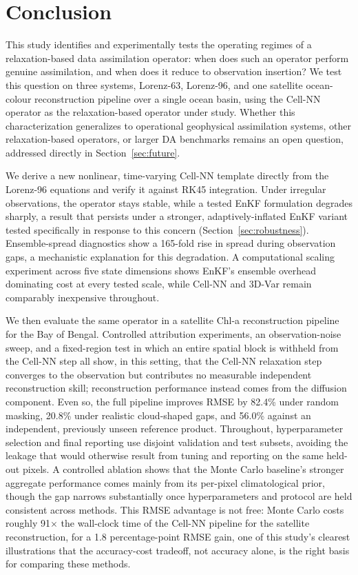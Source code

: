 \documentclass[final,5p,times,twocolumn,authoryear]{elsarticle}
\begin{document}
\FloatBarrier
\section{Conclusion}

This study identifies and experimentally tests the operating regimes
of a relaxation-based data assimilation operator: when does such an
operator perform genuine assimilation, and when does it reduce to
observation insertion? We test this question on three systems,
Lorenz-63, Lorenz-96, and one satellite ocean-colour reconstruction
pipeline over a single ocean basin, using the Cell-NN operator as the
relaxation-based operator under study. Whether this characterization
generalizes to operational geophysical assimilation systems, other
relaxation-based operators, or larger DA benchmarks remains an open
question, addressed directly in Section~\ref{sec:future}.

We derive a new nonlinear, time-varying Cell-NN template directly
from the Lorenz-96 equations and verify it against RK45 integration.
Under irregular observations, the operator stays stable, while a
tested EnKF formulation degrades sharply, a result that persists
under a stronger, adaptively-inflated EnKF variant tested
specifically in response to this concern
(Section~\ref{sec:robustness}). Ensemble-spread diagnostics show a
165-fold rise in spread during observation gaps, a mechanistic
explanation for this degradation. A computational scaling experiment
across five state dimensions shows EnKF's ensemble overhead
dominating cost at every tested scale, while Cell-NN and 3D-Var
remain comparably inexpensive throughout.

We then evaluate the same operator in a satellite Chl-a
reconstruction pipeline for the Bay of Bengal. Controlled attribution
experiments, an observation-noise sweep, and a fixed-region test in
which an entire spatial block is withheld from the Cell-NN step all
show, in this setting, that the Cell-NN relaxation step converges to
the observation but contributes no measurable independent
reconstruction skill; reconstruction performance instead comes from
the diffusion component. Even so, the full pipeline improves RMSE by
82.4\% under random masking, 20.8\% under realistic cloud-shaped
gaps, and 56.0\% against an independent, previously unseen reference
product. Throughout, hyperparameter selection and final reporting
use disjoint validation and test subsets, avoiding the leakage that
would otherwise result from tuning and reporting on the same
held-out pixels. A controlled ablation shows that the Monte Carlo
baseline's stronger aggregate performance comes mainly from its
per-pixel climatological prior, though the gap narrows substantially
once hyperparameters and protocol are held consistent across methods.
This RMSE advantage is not free: Monte Carlo costs roughly
91$\times$ the wall-clock time of the Cell-NN pipeline for the
satellite reconstruction, for a 1.8 percentage-point RMSE gain, one
of this study's clearest illustrations that the accuracy-cost
tradeoff, not accuracy alone, is the right basis for comparing these
methods.
\end{document}
